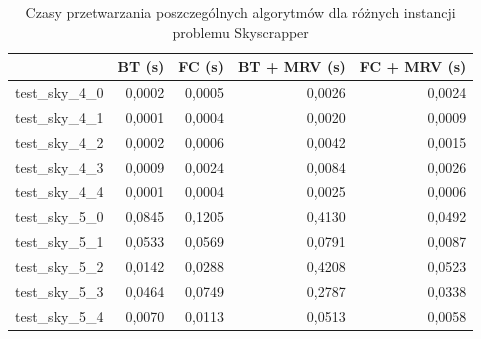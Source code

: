 \documentclass{article}
\begin{document}
	\begin{table}[H]
		\caption{Czasy przetwarzania poszczególnych algorytmów dla różnych instancji problemu Skyscrapper}
		\label{tab:skyscrapper_times}
		\begin{center}
			\begin{tabular}{|l|r|r|r|r|}
				\hline
				& \multicolumn{1}{c|}{\textbf{BT (s)}} & \multicolumn{1}{c|}{\textbf{FC (s)}} & \multicolumn{1}{l|}{\textbf{BT + MRV (s)}} & \multicolumn{1}{l|}{\textbf{FC + MRV (s)}} \\ \hline
				test\_sky\_4\_0 & 0,0002                           & 0,0005                           & 0,0026                                 & 0,0024                                 \\ \hline
				test\_sky\_4\_1 & 0,0001                           & 0,0004                           & 0,0020                                 & 0,0009                                 \\ \hline
				test\_sky\_4\_2 & 0,0002                           & 0,0006                           & 0,0042                                 & 0,0015                                 \\ \hline
				test\_sky\_4\_3 & 0,0009                           & 0,0024                           & 0,0084                                 & 0,0026                                 \\ \hline
				test\_sky\_4\_4 & 0,0001                           & 0,0004                           & 0,0025                                 & 0,0006                                 \\ \hline
				test\_sky\_5\_0 & 0,0845                           & 0,1205                           & 0,4130                                 & 0,0492                                 \\ \hline
				test\_sky\_5\_1 & 0,0533                           & 0,0569                           & 0,0791                                 & 0,0087                                 \\ \hline
				test\_sky\_5\_2 & 0,0142                           & 0,0288                           & 0,4208                                 & 0,0523                                 \\ \hline
				test\_sky\_5\_3 & 0,0464                           & 0,0749                           & 0,2787                                 & 0,0338                                 \\ \hline
				test\_sky\_5\_4 & 0,0070                           & 0,0113                           & 0,0513                                 & 0,0058                                 \\ \hline

\end{tabular}
\end{center}
\end{table}
\end{document}
